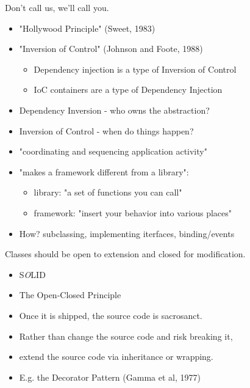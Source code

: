 \documentclass{beamer}
\begin{document}
\begin{frame}{Don't call us, we'll call you.}
    \begin{itemize}
        \item "Hollywood Principle" (Sweet, 1983)
        \item "Inversion of Control" (Johnson and Foote, 1988)
            \begin{itemize}
                \item Dependency injection is a type of Inversion of Control
                \item IoC containers are a type of Dependency Injection
            \end{itemize}
        \item Dependency Inversion - who owns the abstraction?
        \item Inversion of Control - when do things happen?
        \item "coordinating and sequencing application activity"         
        \item "makes a framework different from a library":
            \begin{itemize}
                \item library: "a set of functions you can call"
                \item framework: "insert your behavior into various places"
            \end{itemize}
        \item How? subclassing, implementing iterfaces, binding/events
    \end{itemize}
\end{frame}

\begin{frame}{Classes should be open to extension and closed for modification.}
    \begin{itemize}
        \item S\emph{O}LID %
        \item The Open-Closed Principle
        \item Once it is shipped, the source code is sacrosanct.
        \item Rather than change the source code and risk breaking it, 
        \item extend the source code via inheritance or wrapping. 
        \item E.g. the Decorator Pattern (Gamma et al, 1977)
    \end{itemize}
\end{frame}
\end{document}
